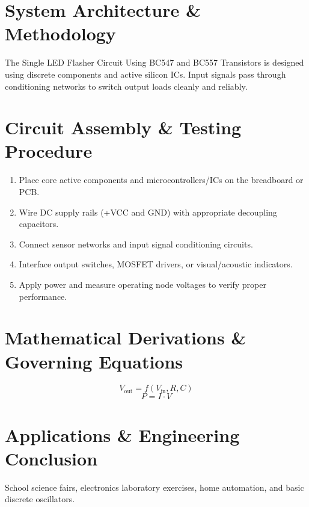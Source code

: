 \documentclass[11pt,a4paper]{article}
\begin{document}
\section{System Architecture \& Methodology}
The Single LED Flasher Circuit Using BC547 and BC557 Transistors is designed using discrete components and active silicon ICs. Input signals pass through conditioning networks to switch output loads cleanly and reliably.

\section{Circuit Assembly \& Testing Procedure}
\begin{enumerate}
    \item Place core active components and microcontrollers/ICs on the breadboard or PCB.
    \item Wire DC supply rails (+VCC and GND) with appropriate decoupling capacitors.
    \item Connect sensor networks and input signal conditioning circuits.
    \item Interface output switches, MOSFET drivers, or visual/acoustic indicators.
    \item Apply power and measure operating node voltages to verify proper performance.
\end{enumerate}

\section{Mathematical Derivations \& Governing Equations}
\begin{equation}
V_{\text{out}} = f(V_{\text{in}}, R, C)
\end{equation}
\begin{equation}
P = I \cdot V
\end{equation}

\section{Applications \& Engineering Conclusion}
School science fairs, electronics laboratory exercises, home automation, and basic discrete oscillators.
\end{document}
